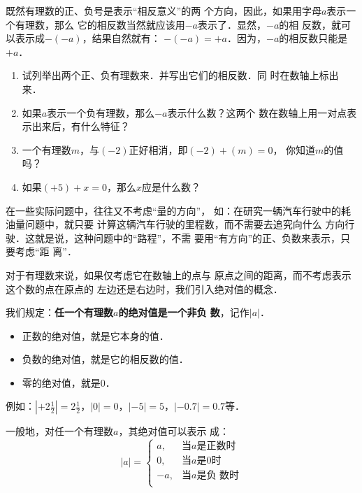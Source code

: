     既然有理数的正、负号是表示“相反意义”的两
个方向，因此，如果用字母$a$表示一个有理数，那么
它的相反数当然就应该用$-a$表示了．显然，$-a$的相
反数，就可以表示成$-(- a)$，结果自然就有：
$-(-a)=+a$．因为，$-a$的相反数只能是$+a$．
    
\begin{ex}
\begin{enumerate}
    \item 试列举出两个正、负有理数来．并写出它们的相反数．同
    时在数轴上标出来．
    \item 如果$a$表示一个负有理数，那么$-a$表示什么数？这两个
    数在数轴上用一对点表示出来后，有什么特征？
    \item 一个有理数$m$，与$(-2)$正好相消，即$(-2)+(m)=0$，
    你知道$m$的值吗？
    \item 如果$(+5) +x=0$，那么$x$应是什么数？
\end{enumerate}    
\end{ex}    
  
在一些实际问题中，往往又不考虑“量的方向”，
如：在研究一辆汽车行驶中的耗油量问题中，就只要
计算这辆汽车行驶的里程数，而不需要去追究向什么
方向行驶．这就是说，这种问题中的“路程”，不需
要用“有方向”的正、负数来表示，只要考虑“距
离”．

    对于有理数来说，如果仅考虑它在数轴上的点与
原点之间的距离，而不考虑表示这个数的点在原点的
左边还是右边时，我们引入绝对值的概念．

    我们规定：\textbf{任一个有理数$a$的绝对值是一个非负
数}，记作$|a|$．

\begin{blk}{}
\begin{itemize}
    \item 正数的绝对值，就是它本身的值．
    \item 负数的绝对值，就是它的相反数的值．
    \item 零的绝对值，就是0．
\end{itemize}
\end{blk}

例如：$\left|+2\frac{1}{2}\right|=2\frac{1}{2}$，$|0|=0$，$|-5|=5$，$|-0.7|=0.7$等．

一般地，对任一个有理数$a$，其绝对值可以表示
成：
\[|a|=\begin{cases}
    a, & \text{当$a$是正数时}\\
    0, & \text{当$a$是0时}\\
    -a, & \text{当$a$是负 数时}\\
\end{cases}\]

